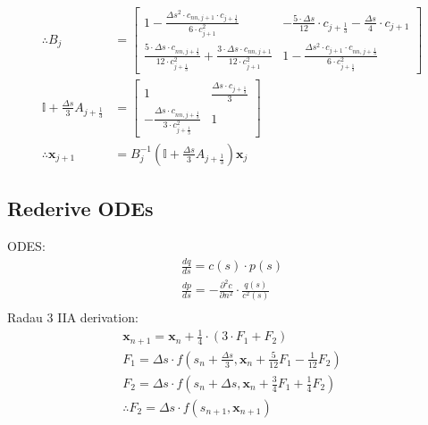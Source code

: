 \documentclass{article}
\begin{document}
\begin{align*}
	\therefore B_j                                   & = \begin{bmatrix} 1-\frac{\Delta s^2\cdot c_{nn, j+1}\cdot c_{j+\frac{1}{3}}}{6\cdot c_{j+1}^2} & - \frac{5\cdot\Delta s}{12}\cdot c_{j+\frac{1}{3}} - \frac{\Delta s}{4}\cdot c_{j+1} \\ \frac{5\cdot\Delta s\cdot c_{nn, j+\frac{1}{3}}}{12\cdot c_{j+\frac{1}{3}}^2} + \frac{3\cdot\Delta s\cdot c_{nn, j+1}}{12\cdot c_{j+1}^2} & 1- \frac{\Delta s^2\cdot c_{j+1}\cdot c_{nn, j+\frac{1}{3}}}{6\cdot c_{j+\frac{1}{3}}^2} \end{bmatrix}                        \\
	\mathbb{I} + \frac{\Delta s}{3}A_{j+\frac{1}{3}} & = \begin{bmatrix} 1 & \frac{\Delta s\cdot c_{j+\frac{1}{3}}}{3} \\ -\frac{\Delta s\cdot c_{nn, j+\frac{1}{3}}}{3\cdot c_{j+\frac{1}{3}}^2} & 1 \end{bmatrix}                                                                                                                                                                                                                                                                                                                                                                                                                                                            \\
	\therefore \bm{x}_{j+1}                          & = B_j^{-1}\left(\mathbb{I} + \frac{\Delta s}{3}A_{j+\frac{1}{3}} \right)\bm{x}_j
\end{align*}

\subsection{Rederive ODEs}
ODES:
\begin{align*}
	\frac{dq}{ds} = c(s)\cdot p(s)                                             \\
	\frac{dp}{ds} = -\frac{\partial^2 c}{\partial n^2}\cdot\frac{q(s)}{c^2(s)} \\
\end{align*}
Radau 3 IIA derivation:
\begin{align*}
	\bm{x}_{n+1} = \bm{x}_n + \frac{1}{4}\cdot\left(3\cdot F_1 + F_2 \right)                                \\
	F_1 = \Delta s \cdot f\left(s_n + \frac{\Delta s}{3}, \bm{x}_n + \frac{5}{12}F_1-\frac{1}{12}F_2\right) \\
	F_2 = \Delta s \cdot f\left(s_n + \Delta s, \bm{x}_n + \frac{3}{4}F_1+\frac{1}{4}F_2\right)             \\
	\therefore F_2 = \Delta s\cdot f\left(s_{n+1}, \bm{x}_{n+1} \right)
\end{align*}
\end{document}
